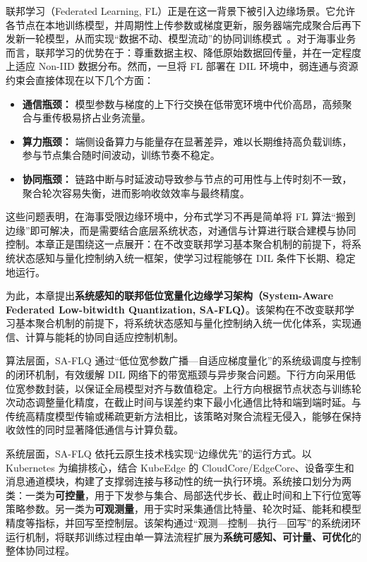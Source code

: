 联邦学习（Federated Learning, FL）正是在这一背景下被引入边缘场景。它允许各节点在本地训练模型，并周期性上传参数或梯度更新，服务器端完成聚合后再下发新一轮模型，从而实现“数据不动、模型流动”的协同训练模式~。对于海事业务而言，联邦学习的优势在于：尊重数据主权、降低原始数据回传量，并在一定程度上适应 Non-IID 数据分布。然而，一旦将 FL 部署在 DIL 环境中，弱连通与资源约束会直接体现在以下几个方面：

\begin{itemize}
	\item \textbf{通信瓶颈：} 模型参数与梯度的上下行交换在低带宽环境中代价高昂，高频聚合与重传极易挤占业务流量。
	\item \textbf{算力瓶颈：} 端侧设备算力与能量存在显著差异，难以长期维持高负载训练，参与节点集合随时间波动，训练节奏不稳定。
	\item \textbf{协同瓶颈：} 链路中断与时延波动导致参与节点的可用性与上传时刻不一致，聚合轮次容易失衡，进而影响收敛效率与最终精度。
\end{itemize}

这些问题表明，在海事受限边缘环境中，分布式学习不再是简单将 FL 算法“搬到边缘”即可解决，而是需要结合底层系统状态，对通信与计算进行联合建模与协同控制。本章正是围绕这一点展开：在不改变联邦学习基本聚合机制的前提下，将系统状态感知与量化控制纳入统一框架，使学习过程能够在 DIL 条件下长期、稳定地运行。

为此，本章提出\textbf{系统感知的联邦低位宽量化边缘学习架构（System-Aware Federated Low-bitwidth Quantization, SA-FLQ）}。该架构在不改变联邦学习基本聚合机制的前提下，将系统状态感知与量化控制纳入统一优化体系，实现通信、计算与能耗的协同自适应控制机制。

算法层面，SA-FLQ 通过“低位宽参数广播—自适应梯度量化”的系统级调度与控制的闭环机制，有效缓解 DIL 网络下的带宽瓶颈与异步聚合问题。下行方向采用低位宽参数封装，以保证全局模型对齐与数值稳定。上行方向根据节点状态与训练轮次动态调整量化精度，在截止时间与误差约束下最小化通信比特和端到端时延。与传统高精度模型传输或稀疏更新方法相比，该策略对聚合流程无侵入，能够在保持收敛性的同时显著降低通信与计算负载。

系统层面，SA-FLQ 依托云原生技术栈实现“边缘优先”的运行方式。以 Kubernetes 为编排核心，结合 KubeEdge 的 CloudCore/EdgeCore、设备孪生和消息通道模块，构建了支撑弱连接与移动性的统一执行环境。系统接口划分为两类：一类为\textbf{可控量}，用于下发参与集合、局部迭代步长、截止时间和上下行位宽等策略参数。另一类为\textbf{可观测量}，用于实时采集通信比特量、轮次时延、能耗和模型精度等指标，并回写至控制层。该架构通过“观测—控制—执行—回写”的系统闭环运行机制，将联邦训练过程由单一算法流程扩展为\textbf{系统可感知、可计量、可优化}的整体协同过程。

